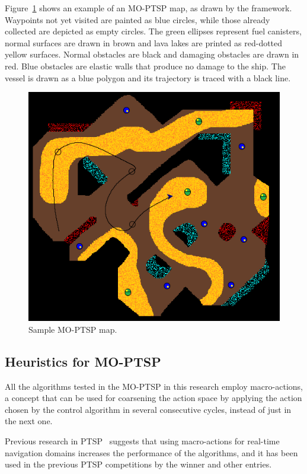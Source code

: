 \documentclass[journal]{IEEEtran}
\begin{document}
Figure~\ref{fig:sampleMap} shows an example of an MO-PTSP map, as drawn by the framework. Waypoints not yet visited are painted as blue circles, while those already collected are depicted as empty circles. The green ellipses represent fuel canisters, normal surfaces are drawn in brown and lava lakes are printed as red-dotted yellow surfaces. Normal obstacles are black and damaging obstacles are drawn in red. Blue obstacles are elastic walls that produce no damage to the ship. The vessel is drawn as a blue polygon and its trajectory is traced with a black line.

\begin{figure} [!t]
	\begin{center}
	\includegraphics[width=0.8\columnwidth]{figures/perez8}
	\caption{Sample MO-PTSP map.}
	\label{fig:sampleMap}
	\end{center}
\end{figure}

\subsection{Heuristics for MO-PTSP} \label{sssec:heurMOPTSP}

All the algorithms tested in the MO-PTSP in this research employ macro-actions, a concept that can be used for coarsening the action space by applying the action chosen by the control algorithm in several consecutive cycles, instead of just in the next one. 

Previous research in PTSP~\cite{Perez2013, Perez2012} suggests that using macro-actions for real-time navigation domains increases the performance of the algorithms, and it has been used in the previous PTSP competitions by the winner and other entries.
\end{document}
